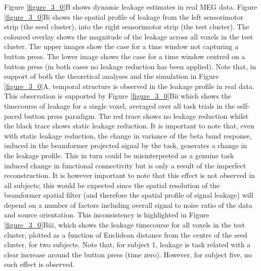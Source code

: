 Figure \ref{figure_3_0}B shows dynamic leakage estimates in real MEG data. Figure \ref{figure_3_0}Bi shows the spatial profile of leakage from the left sensorimotor strip (the seed cluster), into the right sensorimotor strip (the test cluster). The coloured overlay shows the magnitude of the leakage across all voxels in the test cluster. The upper images show the case for a time window not capturing a button press. The lower image shows the case for a time window centred on a button press (in both cases no leakage reduction has been applied). Note that, in support of both the theoretical analyses and the simulation in Figure \ref{figure_3_0}A, temporal structure is observed in the leakage profile in real data. This observation is supported by Figure \ref{figure_3_0}Bii which shows the timecourse of leakage for a single voxel, averaged over all task trials in the self-paced button press paradigm. The red trace shows no leakage reduction whilst the black trace shows static leakage reduction.  It is important to note that, even with static leakage reduction, the change in variance of the beta band response, induced in the beamformer projected signal by the task, generates a change in the leakage profile. This in turn could be misinterpreted as a genuine task induced change in functional connectivity but is only a result of the imperfect reconstruction. It is however important to note that this effect is not observed in all subjects; this would be expected since the spatial resolution of the beamformer spatial filter (and therefore the spatial profile of signal leakage) will depend on a number of factors including overall signal to noise ratio of the data and source orientation. This inconsistency is highlighted in Figure \ref{figure_3_0}Biii, which shows the leakage timecourse for all voxels in the test cluster, plotted as a function of Euclidean distance from the centre of the seed cluster, for two subjects. Note that, for subject 1, leakage is task related with a clear increase around the button press (time zero). However, for subject five, no such effect is observed. 

